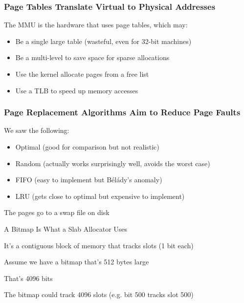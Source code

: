   \begin{frame}
    \frametitle{Page Tables Translate Virtual to Physical Addresses}

    The MMU is the hardware that uses page tables, which may:
    \begin{itemize}
      \item Be a single large table (wasteful, even for 32-bit machines)
      \item Be a multi-level to save space for sparse allocations
      \item Use the kernel allocate pages from a free list
      \item Use a TLB to speed up memory accesses
    \end{itemize}
  \end{frame}

  \begin{frame}
    \frametitle{Page Replacement Algorithms Aim to Reduce Page Faults}

    We saw the following:
    \begin{itemize}
      \item Optimal (good for comparison but not realistic)
      \item Random (actually works surprisingly well, avoids the worst case)
      \item FIFO (easy to implement but Bélády's anomaly)
      \item LRU (gets close to optimal but expensive to implement)
    \end{itemize}

    \vspace{2em}

    The pages go to a swap file on disk
  \end{frame}
  
  \begin{frame}{A Bitmap Is What a Slab Allocator Uses}

    It's a contiguous block of memory that tracks slots (1 bit each)

    \vspace{2em}

    Assume we have a bitmap that's 512 bytes large

    \hspace{2em} That's 4096 bits

    \vspace{2em}

    The bitmap could track 4096 slots (e.g. bit 500 tracks slot 500)
  \end{frame}

